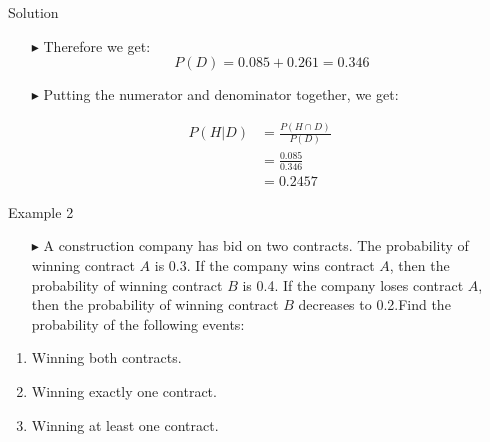 \documentclass[12pt]{beamer}
\begin{document}
\begin{frame}{Solution}
	\begin{itemize}
		\item[\color{blue}$\blacktriangleright$] Therefore we get:
		$$P(D)=0.085+0.261=0.346$$
		\item[\color{blue}$\blacktriangleright$] Putting the numerator and denominator together, we get:
	\end{itemize}
	\begin{align*}
		P(H|D)&=\frac{P(H\cap D)}{P(D)}\\
		&=\frac{0.085}{0.346}\\
		&=0.2457
	\end{align*}
	
\end{frame}
\begin{frame}{Example 2}
	\begin{itemize}
		\item[\color{blue}$\blacktriangleright$] A construction company has bid on two contracts. The probability of winning contract $A$ is 0.3. If the company wins contract $A$, then the probability of winning contract $B$ is 0.4. If the company loses contract $A$, then the probability of winning contract $B$ decreases to 0.2.Find the probability of the following events:
	\end{itemize}
	\begin{enumerate}[label=\textcolor{blue}{(\alph*)}]
		\item Winning both contracts.
		\item Winning exactly one contract.
		\item Winning at least one contract.
	\end{enumerate}
	
\end{frame}
\end{document}
